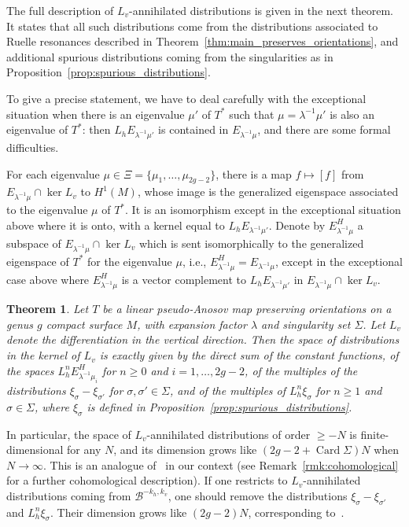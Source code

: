\documentclass[11pt, a4paper, oneside, final, pagebackref]{amsart}
\newcommand{\boB}{\mathcal{B}}
\DeclareMathOperator{\Card}{Card}
\renewcommand{\geq}{\geqslant}
\newtheorem{thm}{Theorem}[section]
\theoremstyle{definition}
\numberwithin{equation}{section}
\begin{document}
The full description of $L_v$-annihilated distributions is given in the next
theorem. It states that all such distributions come from the distributions
associated to Ruelle resonances described in
Theorem~\ref{thm:main_preserves_orientations}, and additional spurious
distributions coming from the singularities as in
Proposition~\ref{prop:spurious_distributions}.

To give a precise statement, we have to deal carefully with the exceptional
situation when there is an eigenvalue $\mu'$ of $T^*$ such that
$\mu=\lambda^{-1}\mu'$ is also an eigenvalue of $T^*$: then $L_h
E_{\lambda^{-1}\mu'}$ is contained in $E_{\lambda^{-1}\mu}$, and there are
some formal difficulties.

For each eigenvalue $\mu \in \Xi = \{\mu_1,\dotsc, \mu_{2g-2}\}$, there is a
map $f \mapsto [f]$ from $E_{\lambda^{-1}\mu} \cap \ker L_v$ to $H^1(M)$,
whose image is the generalized eigenspace associated to the eigenvalue $\mu$
of $T^*$. It is an isomorphism except in the exceptional situation above
where it is onto, with a kernel equal to $L_h E_{\lambda^{-1}\mu'}$. Denote
by $E_{\lambda^{-1}\mu}^H$ a subspace of $E_{\lambda^{-1}\mu}\cap \ker L_v$
which is sent isomorphically to the generalized eigenspace of $T^*$ for the
eigenvalue $\mu$, i.e., $E_{\lambda^{-1}\mu}^H = E_{\lambda^{-1}\mu}$, except
in the exceptional case above where $E_{\lambda^{-1}\mu}^H$ is a vector
complement to $L_h E_{\lambda^{-1}\mu'}$ in $E_{\lambda^{-1}\mu}\cap \ker
L_v$.

\begin{thm}
\label{thm:Lv_invariant_preserves_orientations} Let $T$ be a linear
pseudo-Anosov map preserving orientations on a genus $g$ compact surface $M$,
with expansion factor $\lambda$ and singularity set $\Sigma$. Let $L_v$
denote the differentiation in the vertical direction. Then the space of
distributions in the kernel of $L_v$ is exactly given by the direct sum of
the constant functions, of the spaces $L_h^n E^H_{\lambda^{-1}\mu_i}$ for
$n\geq 0$ and $i=1,\dotsc, 2g-2$, of the multiples of the distributions
$\xi_\sigma - \xi_{\sigma'}$ for $\sigma,\sigma'\in \Sigma$, and of the
multiples of $L_h^n \xi_\sigma$ for $n \geq 1$ and $\sigma \in \Sigma$, where
$\xi_\sigma$ is defined in Proposition~\ref{prop:spurious_distributions}.
\end{thm}

In particular, the space of $L_v$-annihilated distributions of order $\geq
-N$ is finite-dimensional for any $N$, and its dimension grows like $(2g-2 +
\Card \Sigma)N$ when $N\to \infty$. This is an analogue
of~\cite[Theorem~7.7(i)]{forni_deviation} in our context (see
Remark~\ref{rmk:cohomological} for a further cohomological description). If
one restricts to $L_v$-annihilated distributions coming from $\boB^{-k_h,
k_v}$, one should remove the distributions $\xi_\sigma - \xi_{\sigma'}$ and
$L_h^n \xi_\sigma$. Their dimension grows like $(2g-2)N$, corresponding
to~\cite[Theorem~7.7(ii)]{forni_deviation}.
\end{document}
